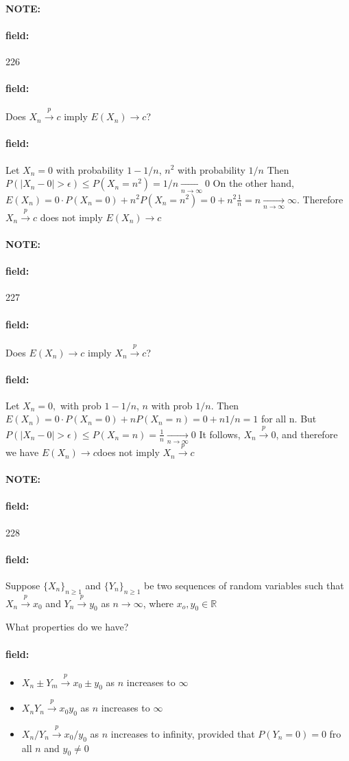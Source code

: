 \documentclass[12pt]{article}
\newenvironment{note}{\paragraph{NOTE:}}{}
\newenvironment{field}{\paragraph{field:}}{}
\begin{document}
\begin{note} \begin{field} \tiny 226 \end{field}
  \begin{field}
    Does $X_n \overset{p}{\to} c$ imply $E(X_n) \to c $?
  \end{field}
  \begin{field}
    Let $X_n = 0$ with probability $1 - 1/n$, $n^2 $ with probability $1/n$
    Then $P(|X_n - 0| > \epsilon) \leq P(X_n = n^2) = 1/n \underset{n \to \infty}{\to} 0$
    On the other hand,
    $E(X_n) = 0 \cdot P(X_n =0) + n^2P(X_n = n^2) = 0 + n^2 \frac{1}{n} = n \underset{n \to \infty}{\to} \infty$.
    Therefore $X_n \overset{p}{\to} c$ does not imply $E(X_n) \to c $
  \end{field}
\end{note}

\begin{note} \begin{field} \tiny 227 \end{field}
  \begin{field}
    Does $E(X_n) \to c $ imply $X_n \overset{p}{\to}c$?
  \end{field}
  \begin{field}
    Let $X_n = 0, $ with prob $1 - 1/n$, $n$ with prob $1/n$.
    Then $E(X_n) = 0 \cdot P(X_n = 0) + n P(X_n = n) = 0  + n 1/n = 1$ for all n.
    But $P(|X_n - 0| > \epsilon) \leq P(X_n = n) = \frac{1}{n } \underset{n \to \infty}{\to} 0$
    It follows, $X_n \overset{p}{\to} 0 $, and therefore we have $E(X_n) \to c $does not imply $X_n \overset{p}{\to}c$
  \end{field}
\end{note}

\begin{note} \begin{field} \tiny 228 \end{field}
  \begin{field}
     Suppose $\{X_n\}_{n \geq 1}$ and $\{Y_n\}_{n \geq 1}$ be two sequences of random variables such that $X_n \overset{p}{\to} x_0$ and $Y_n \overset{p}{\to} y_0$ as $n \to \infty$, where $x_o, y_0 \in \mathbb{R}$

     What properties do we have?
  \end{field}
  \begin{field}
    \begin{itemize}
      \item $X_n \pm Y_m \overset{p}{\to} x_0 \pm y_0$ as $n$ increases to $\infty$
      \item $X_nY_n \overset{p}{\to} x_0y_0$ as $n$ increases to $\infty$
      \item $X_n/Y_n \overset{p}{\to} x_0/y_0$ as $n$ increases to infinity, provided that $P(Y_n = 0) = 0 $ fro all $n$ and $y_0 \neq 0$
    \end{itemize}
  \end{field}
\end{note}
\end{document}
